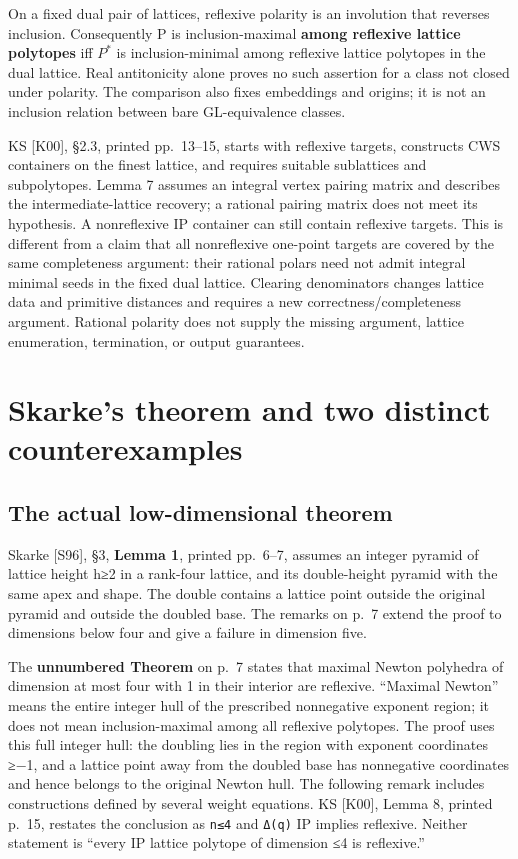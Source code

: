 \documentclass[11pt,a4paper,oneside]{report}
\begin{document}
On a fixed dual pair of lattices, reflexive polarity is an involution
that reverses inclusion. Consequently P is inclusion-maximal
\textbf{among reflexive lattice polytopes} iff \(P^{*}\) is
inclusion-minimal among reflexive lattice polytopes in the dual lattice.
Real antitonicity alone proves no such assertion for a class not closed
under polarity. The comparison also fixes embeddings and origins; it is
not an inclusion relation between bare GL-equivalence classes.

KS {[}K00{]}, §2.3, printed pp.~13--15, starts with reflexive targets,
constructs CWS containers on the finest lattice, and requires suitable
sublattices and subpolytopes. Lemma 7 assumes an integral vertex pairing
matrix and describes the intermediate-lattice recovery; a rational
pairing matrix does not meet its hypothesis. A nonreflexive IP container
can still contain reflexive targets. This is different from a claim that
all nonreflexive one-point targets are covered by the same completeness
argument: their rational polars need not admit integral minimal seeds in
the fixed dual lattice. Clearing denominators changes lattice data and
primitive distances and requires a new correctness/completeness
argument. Rational polarity does not supply the missing argument,
lattice enumeration, termination, or output guarantees.

\section{Skarke's theorem and two distinct
counterexamples}\label{ip-reflexivity-and-pyramids--skarkes-theorem-and-two-distinct-counterexamples}

\subsection{The actual low-dimensional
theorem}\label{ip-reflexivity-and-pyramids--the-actual-low-dimensional-theorem}

Skarke {[}S96{]}, §3, \textbf{Lemma 1}, printed pp.~6--7, assumes an
integer pyramid of lattice height h≥2 in a rank-four lattice, and its
double-height pyramid with the same apex and shape. The double contains
a lattice point outside the original pyramid and outside the doubled
base. The remarks on p.~7 extend the proof to dimensions below four and
give a failure in dimension five.

The \textbf{unnumbered Theorem} on p.~7 states that maximal Newton
polyhedra of dimension at most four with 1 in their interior are
reflexive. ``Maximal Newton'' means the entire integer hull of the
prescribed nonnegative exponent region; it does not mean
inclusion-maximal among all reflexive polytopes. The proof uses this
full integer hull: the doubling lies in the region with exponent
coordinates ≥−1, and a lattice point away from the doubled base has
nonnegative coordinates and hence belongs to the original Newton hull.
The following remark includes constructions defined by several weight
equations. KS {[}K00{]}, Lemma 8, printed p.~15, restates the conclusion
as \texttt{n≤4} and \texttt{Δ(\allowbreak{}q)} IP implies reflexive.
Neither statement is ``every IP lattice polytope of dimension ≤4 is
reflexive.''
\end{document}
